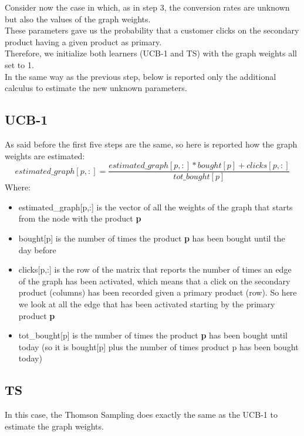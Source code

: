 Consider now the case in which, as in step 3, the conversion rates are unknown but also the values of the graph weights.\\ These parameters gave us the probability that a customer clicks on the secondary product having a given product as primary.\\ Therefore, we initialize both learners (UCB-1 and TS) with the graph weights all set to 1.\\ 
In the same way as the previous step, below is reported only the additional calculus to estimate the new unknown parameters.

\subsection{UCB-1}
As said before the first five steps are the same, so here is reported how the graph weights are estimated:
\begin{equation}
    estimated\_graph[p,:] = \frac{estimated\_graph[p,:] * bought[p] + clicks[p,:]}{tot\_bought[p]}
\end{equation}Where: \begin{itemize}
    \item estimated\_graph[p,:] is the vector of all the weights of the graph that starts from the node with the product {\bf p}
    \item bought[p] is the number of times the product {\bf p} has been bought until the day before
    \item clicks[p,:] is the row of the matrix that reports the number of times an edge of the graph has been activated, which means that a click on the secondary product (columns) has been recorded given a primary product (row). So here we look at all the edge that has been activated starting by the primary product {\bf p}
    \item tot\_bought[p] is the number of times the product {\bf p} has been bought until today (so it is bought[p] plus the number of times product p has been bought today)
\end{itemize}
\subsection{TS}
In this case, the Thomson Sampling does exactly the same as the UCB-1 to estimate the graph weights.
\newpage

